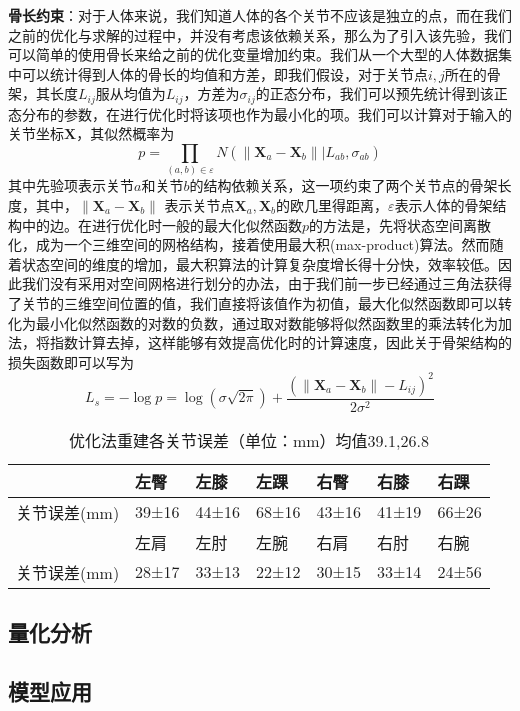 \textbf{骨长约束}：对于人体来说，我们知道人体的各个关节不应该是独立的点，而在我们之前的优化与求解的过程中，并没有考虑该依赖关系，那么为了引入该先验，我们可以简单的使用骨长来给之前的优化变量增加约束。我们从一个大型的人体数据集中可以统计得到人体的骨长的均值和方差，即我们假设，对于关节点\(i,j\)所在的骨架，其长度\(L_{ij}\)服从均值为\(L_{ij}\)，方差为\(\sigma_{ij}\)的正态分布，我们可以预先统计得到该正态分布的参数，在进行优化时将该项也作为最小化的项。我们可以计算对于输入的关节坐标\(\bm{X}\)，其似然概率为
\begin{equation}
    p  = \prod _ { ( a,b ) \in \varepsilon } N \left( \left\| \boldsymbol {X} _ { a } - \boldsymbol {X} _ { b } \right\| | L _ {ab} , \sigma _ {ab} \right)
\end{equation}
其中先验项表示关节\(a\)和关节\(b\)的结构依赖关系，这一项约束了两个关节点的骨架长度，其中，\(\left\| \boldsymbol {X} _ { a } - \boldsymbol {X} _ { b } \right\|\) 表示关节点\(\boldsymbol {X} _ { a }, \boldsymbol {X} _ { b } \)的欧几里得距离，\(\varepsilon\)表示人体的骨架结构中的边。在进行优化时一般的最大化似然函数\(p\)的方法是，先将状态空间离散化，成为一个三维空间的网格结构，接着使用最大积(max-product)算法\cite{max-product}。然而随着状态空间的维度的增加，最大积算法的计算复杂度增长得十分快，效率较低。因此我们没有采用对空间网格进行划分的办法，由于我们前一步已经通过三角法获得了关节的三维空间位置的值，我们直接将该值作为初值，最大化似然函数即可以转化为最小化似然函数的对数的负数，通过取对数能够将似然函数里的乘法转化为加法，将指数计算去掉，这样能够有效提高优化时的计算速度，因此关于骨架结构的损失函数即可以写为
\begin{equation}
    L_{s} = -\log p = \log (\sigma \sqrt{2\pi}) + \frac{(\left\| \boldsymbol {X} _ { a } - \boldsymbol {X} _ { b } \right\| - L_{ij})^2}{2\sigma^2}
\end{equation}

\begin{table}[H]
    \centering
    \begin{tabular}{lllllll}
        \hline
                      & 左臀   & 左膝   & 左踝   & 右臀   & 右膝   & 右踝   \\
        \hline
         关节误差(mm) & 39±16  & 44±16  & 68±16  & 43±16  & 41±19  & 66±26  \\
                      & 左肩   & 左肘   & 左腕   & 右肩   & 右肘   & 右腕   \\
         关节误差(mm) & 28±17  & 33±13  & 22±12  & 30±15  & 33±14  & 24±56  \\
        \hline
        \end{tabular}
    \caption{优化法重建各关节误差（单位：mm）均值39.1,26.8\label{tab:3derroropt}}
\end{table} 
\subsection{量化分析}

\subsection{模型应用}
 
